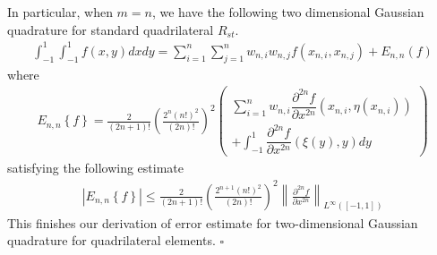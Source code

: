 \documentclass[a4paper]{article}
\numberwithin{equation}{section}
\begin{document}
In particular, when $m=n$, we have the following two dimensional Gaussian quadrature for standard quadrilateral $R_{st}$.
\begin{align}
\int_{ - 1}^1 {\int_{ - 1}^1 {f\left( {x,y} \right)dx} dy}  = \sum\limits_{i = 1}^n {\sum\limits_{j = 1}^n {{w_{n,i}}{w_{n,j}}f\left( {{x_{n,i}},{x_{n,j}}} \right)} }  + {E_{n,n}}\left( f \right)
\end{align}
where
\begin{align}
{E_{n,n}}\left\{ f \right\} = \frac{2}{{\left( {2n + 1} \right)!}}{\left( {\frac{{{2^n}{{\left( {n!} \right)}^2}}}{{\left( {2n} \right)!}}} \right)^2}\left( \begin{array}{l}
\sum\limits_{i = 1}^n {{w_{n,i}}{{\dfrac{{{\partial ^{2n}}f}}{{\partial {x^{2n}}}}}}\left( {{x_{n,i}},\eta \left( {{x_{n,i}}} \right)} \right)} \\
 + \int_{ - 1}^1 {{{\dfrac{{{\partial ^{2n}}f}}{{\partial {x^{2n}}}}}}\left( {\xi \left( y \right),y} \right)dy} 
\end{array} \right)
\end{align}
satisfying the following estimate
\begin{align}
\left| {{E_{n,n}}\left\{ f \right\}} \right| \le \frac{2}{{\left( {2n + 1} \right)!}}{\left( {\frac{{{2^{n + 1}}{{\left( {n!} \right)}^2}}}{{\left( {2n} \right)!}}} \right)^2}{\left\| {{{\frac{{{\partial ^{2n}}f}}{{\partial {x^{2n}}}}}}} \right\|_{{L^\infty }\left( {\left[ { - 1,1} \right]} \right)}}
\end{align}
This finishes our derivation of error estimate for two-dimensional Gaussian quadrature for quadrilateral elements. \hfill $\square$
\end{document}
